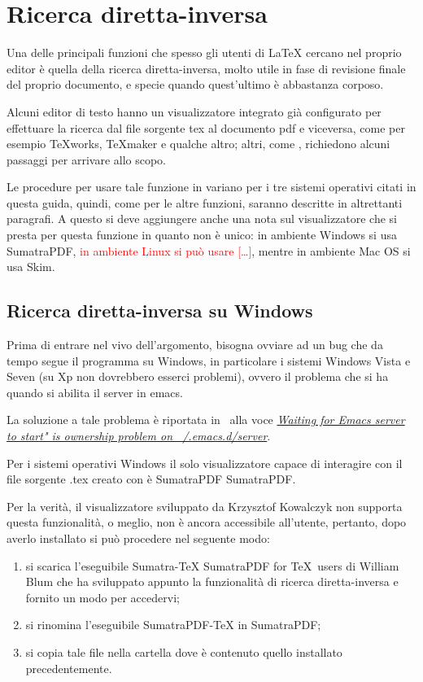 \documentclass[11pt,a4paper]{article}
\begin{document}
\section{Ricerca diretta-inversa}
\label{sec:ricdirinv}

Una delle principali funzioni che spesso gli utenti di \LaTeX{} cercano nel
proprio editor è quella della ricerca diretta-inversa, molto utile in fase di
revisione finale del proprio documento, e specie quando quest'ultimo è
abbastanza corposo.

Alcuni editor di testo hanno un visualizzatore integrato già configurato per
effettuare la ricerca dal file sorgente tex al documento pdf e viceversa, come
per esempio \TeX works, \TeX maker e qualche altro; altri, come \emacs,
richiedono alcuni passaggi per arrivare allo scopo.

Le procedure per usare tale funzione in \emacs{} variano per i tre sistemi
operativi citati in questa guida, quindi, come per le altre funzioni, saranno
descritte in altrettanti paragrafi. A questo si deve aggiungere anche una nota
sul visualizzatore che si presta per questa funzione in quanto non è unico: in
ambiente Windows si usa SumatraPDF, \textcolor{red}{in ambiente Linux si
  può usare [\ldots]}, mentre in ambiente Mac OS si usa Skim.

\subsection{Ricerca diretta-inversa su Windows}
\label{sec:fiswin}
Prima di entrare nel vivo dell'argomento, bisogna ovviare ad un bug che da tempo
segue il programma \emacs{} su Windows, in particolare i sistemi Windows Vista e
Seven (su Xp non dovrebbero esserci problemi), ovvero il problema che si ha
quando si abilita il server in emacs. %

La soluzione a tale problema è riportata in~\parencite{emacsW32:wiki}
alla voce
\href{http://www.emacswiki.org/emacs/EmacsW32#toc49}{\emph{Waiting for
    Emacs server to start" is ownership problem on
    ~/.emacs.d/server}}.

Per i sistemi operativi Windows il solo visualizzatore capace di
interagire con il file sorgente \textsf{.tex} creato con \emacs{} è
SumatraPDF %
%
{SumatraPDF}.

Per la verità, il visualizzatore sviluppato da Krzysztof Kowalczyk non
supporta questa funzionalità, o meglio, non è ancora accessibile
all'utente, pertanto, dopo averlo installato si può procedere nel
seguente modo:
\begin{enumerate}
\item si scarica l'eseguibile Sumatra-\TeX{} %
%
     {SumatraPDF for \TeX\ users}
di William Blum che ha sviluppato appunto la funzionalità di ricerca
diretta-inversa e fornito un modo per accedervi;
\item si rinomina l'eseguibile SumatraPDF-TeX in SumatraPDF;
\item si copia tale file nella cartella dove è contenuto quello
  installato precedentemente.
\end{enumerate}
\end{document}

